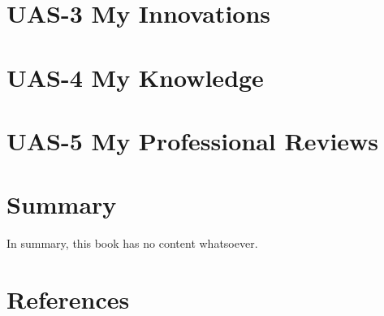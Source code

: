 \documentclass[
  letterpaper,
  DIV=11,
  numbers=noendperiod]{scrreprt}
\begin{document}

\chapter{UAS-3 My Innovations}\label{uas-3-my-innovations}


\chapter{UAS-4 My Knowledge}\label{uas-4-my-knowledge}


\chapter{UAS-5 My Professional
Reviews}\label{uas-5-my-professional-reviews}


\chapter{Summary}\label{summary}

In summary, this book has no content whatsoever.


\chapter*{References}\label{references}


\label{refs}
\end{document}

